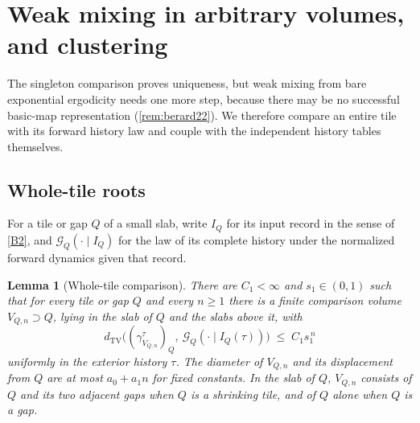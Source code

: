 \documentclass[11pt]{article}
\theoremstyle{plain}
\newtheorem{lemma}[theorem]{Lemma}
\theoremstyle{definition}
\theoremstyle{remark}
\newcommand{\dtv}{d_{\mathrm{TV}}}
\begin{document}
\section{Weak mixing in arbitrary volumes, and clustering}
\label{sec:wsm}

The singleton comparison proves uniqueness, but weak mixing from bare exponential ergodicity needs one more step, because there may be no successful basic-map representation (\cref{rem:berard22}). We therefore compare an entire tile with its forward history law and couple with the independent history tables themselves.

\subsection{Whole-tile roots}

For a tile or gap $Q$ of a small slab, write $I_Q$ for its input record in the sense of \ref{B2}, and $\mathcal G_Q(\cdot\mid I_Q)$ for the law of its complete history under the normalized forward dynamics given that record.

\begin{lemma}[Whole-tile comparison]
\label{lem:tile}
There are $C_1<\infty$ and $s_1\in(0,1)$ such that for every tile or gap $Q$ and every $n\ge1$ there is a finite comparison volume $V_{Q,n}\supset Q$, lying in the slab of $Q$ and the slabs above it, with
\begin{equation}
\dtv\bigl((\gamma^\tau_{V_{Q,n}})_Q,\ \mathcal G_Q(\cdot\mid I_Q(\tau))\bigr)\;\le\;C_1s_1^{\,n}
\label{eq:tile}
\end{equation}
uniformly in the exterior history $\tau$. The diameter of $V_{Q,n}$ and its displacement from $Q$ are at most $a_0+a_1n$ for fixed constants. In the slab of $Q$, $V_{Q,n}$ consists of $Q$ and its two adjacent gaps when $Q$ is a shrinking tile, and of $Q$ alone when $Q$ is a gap.
\end{lemma}
\end{document}
